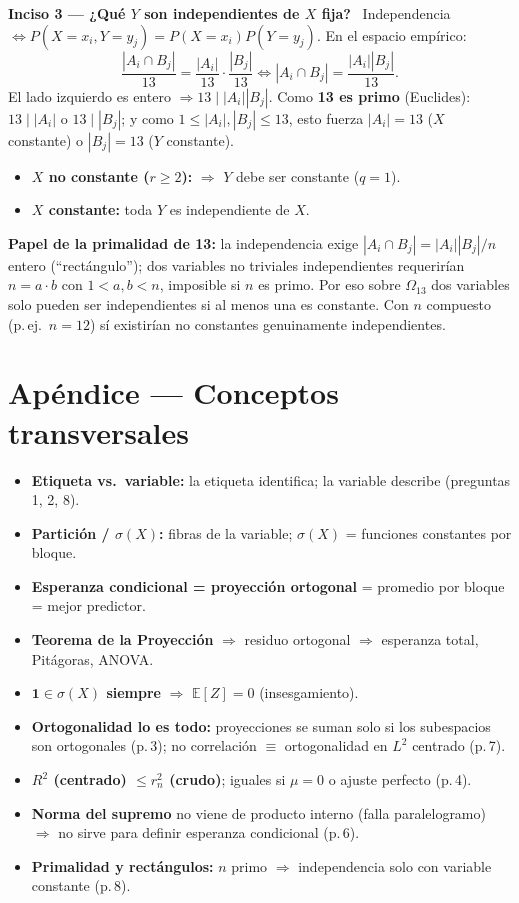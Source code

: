 \documentclass[11pt]{article}
\newcommand{\E}{\mathbb{E}}
\newcommand{\sg}{\sigma}
\newcommand{\inc}[1]{\smallskip\noindent\textbf{\color{blue!30!black}#1}\ }
\begin{document}
\inc{Inciso 3 — ¿Qué $Y$ son independientes de $X$ fija?} Independencia $\iff
P(X=x_i,Y=y_j)=P(X=x_i)P(Y=y_j)$. En el espacio empírico:
\[ \frac{|A_i\cap B_j|}{13}=\frac{|A_i|}{13}\cdot\frac{|B_j|}{13}\iff |A_i\cap B_j|=\frac{|A_i||B_j|}{13}. \]
El lado izquierdo es entero $\Rightarrow 13\mid|A_i||B_j|$. Como \textbf{13 es primo} (Euclides):
$13\mid|A_i|$ o $13\mid|B_j|$; y como $1\le|A_i|,|B_j|\le13$, esto fuerza $|A_i|=13$ ($X$ constante) o
$|B_j|=13$ ($Y$ constante).
\begin{itemize}[leftmargin=1.4em,itemsep=1pt]
\item \textbf{$X$ no constante ($r\ge2$):} $\Rightarrow$ $Y$ debe ser constante ($q=1$).
\item \textbf{$X$ constante:} toda $Y$ es independiente de $X$.
\end{itemize}
\begin{keybox}
\textbf{Papel de la primalidad de 13:} la independencia exige $|A_i\cap B_j|=|A_i||B_j|/n$ entero
(``rectángulo''); dos variables no triviales independientes requerirían $n=a\cdot b$ con $1<a,b<n$,
imposible si $n$ es primo. Por eso sobre $\Omega_{13}$ dos variables solo pueden ser independientes si al
menos una es constante. Con $n$ compuesto (p.\,ej.\ $n=12$) sí existirían no constantes genuinamente independientes.
\end{keybox}

\section*{Apéndice — Conceptos transversales}
\begin{itemize}[leftmargin=1.4em,itemsep=2pt]
\item \textbf{Etiqueta vs.\ variable:} la etiqueta identifica; la variable describe (preguntas 1, 2, 8).
\item \textbf{Partición / $\sg(X)$:} fibras de la variable; $\sg(X)$ = funciones constantes por bloque.
\item \textbf{Esperanza condicional = proyección ortogonal} = promedio por bloque = mejor predictor.
\item \textbf{Teorema de la Proyección} $\Rightarrow$ residuo ortogonal $\Rightarrow$ esperanza total, Pitágoras, ANOVA.
\item \textbf{$\mathbf 1\in\sg(X)$ siempre} $\Rightarrow$ $\E[Z]=0$ (insesgamiento).
\item \textbf{Ortogonalidad lo es todo:} proyecciones se suman solo si los subespacios son ortogonales
(p.\,3); no correlación $\equiv$ ortogonalidad en $L^2$ centrado (p.\,7).
\item \textbf{$R^2$ (centrado) $\le r_n^2$ (crudo)}; iguales si $\mu=0$ o ajuste perfecto (p.\,4).
\item \textbf{Norma del supremo} no viene de producto interno (falla paralelogramo) $\Rightarrow$ no sirve
para definir esperanza condicional (p.\,6).
\item \textbf{Primalidad y rectángulos:} $n$ primo $\Rightarrow$ independencia solo con variable constante (p.\,8).
\end{itemize}
\end{document}

